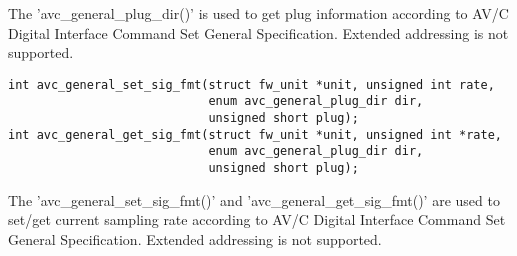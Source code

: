 \documentclass[onecolumn]{article}
\begin{document}
The 'avc\_general\_plug\_dir()' is used to get plug information according to AV/C Digital Interface Command Set General Specification. Extended addressing is not supported.

\begin{verbatim}
int avc_general_set_sig_fmt(struct fw_unit *unit, unsigned int rate,
                            enum avc_general_plug_dir dir,
                            unsigned short plug);
int avc_general_get_sig_fmt(struct fw_unit *unit, unsigned int *rate,
                            enum avc_general_plug_dir dir,
                            unsigned short plug);
\end{verbatim}

The 'avc\_general\_set\_sig\_fmt()' and 'avc\_general\_get\_sig\_fmt()' are used to set/get current sampling rate according to AV/C Digital Interface Command Set General Specification. Extended addressing is not supported.
\end{document}
